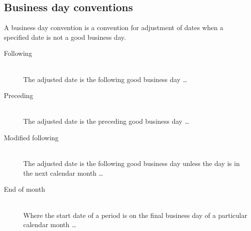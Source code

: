\documentclass[11pt,a4paper]{article}
\numberwithin{equation}{section}
\begin{document}

	\subsection{Business day conventions}
	A business day convention is a convention for adjustment of dates when a specified date is not a good business day.
	\begin{description}
	  \item[Following] \hfill \\
	The adjusted date is the following good business day \ldots
	  \item[Preceding] \hfill \\
		The adjusted date is the preceding good business day \ldots
	  \item[Modified following] \hfill \\
	  The adjusted date is the following good business day unless the day is in the next calendar month \ldots
	  \item[End of month] \hfill \\
	Where the start date of a period is on the final business day of a particular calendar month \ldots
	\end{description}



\newpage



\end{document}
